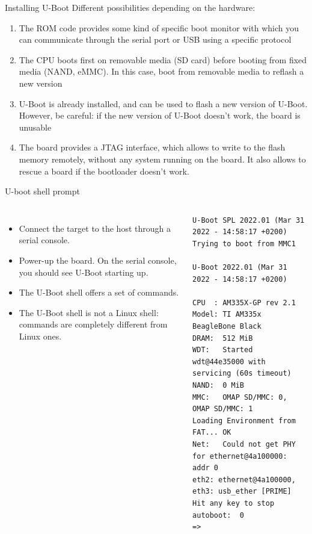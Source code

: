 \begin{frame}{Installing U-Boot}
  Different possibilities depending on the hardware:
  \begin{enumerate}
  \item The ROM code provides some kind of specific boot monitor with
    which you can communicate through the serial port or USB using a
    specific protocol
  \item The CPU boots first on removable media (SD card) before
    booting from fixed media (NAND, eMMC). In this case, boot from
    removable media to reflash a new version
  \item U-Boot is already installed, and can be used to flash a new
    version of U-Boot. However, be careful: if the new version of
    U-Boot doesn't work, the board is unusable
  \item The board provides a JTAG interface, which allows to write to
    the flash memory remotely, without any system running on the
    board. It also allows to rescue a board if the bootloader doesn't
    work.
  \end{enumerate}
\end{frame}

\begin{frame}[fragile]{U-boot shell prompt}
  \begin{columns}
    \begin{itemize}
    \item Connect the target to the host through a serial console.
    \item Power-up the board. On the serial console, you should
      see U-Boot starting up.
    \item The U-Boot shell offers a set of commands.
    \item The U-Boot shell is not a Linux shell: commands are
      completely different from Linux ones.
    \end{itemize}
    \begin{block}{}
      {\tiny
\begin{verbatim}
U-Boot SPL 2022.01 (Mar 31 2022 - 14:58:17 +0200)
Trying to boot from MMC1

U-Boot 2022.01 (Mar 31 2022 - 14:58:17 +0200)

CPU  : AM335X-GP rev 2.1
Model: TI AM335x BeagleBone Black
DRAM:  512 MiB
WDT:   Started wdt@44e35000 with servicing (60s timeout)
NAND:  0 MiB
MMC:   OMAP SD/MMC: 0, OMAP SD/MMC: 1
Loading Environment from FAT... OK
Net:   Could not get PHY for ethernet@4a100000: addr 0
eth2: ethernet@4a100000, eth3: usb_ether [PRIME]
Hit any key to stop autoboot:  0
=>
\end{verbatim}
      }
    \end{block}
  \end{columns}
\end{frame}

